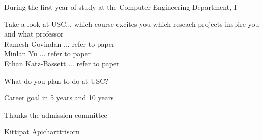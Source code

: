 \documentclass[a4paper]{report}
\begin{document}
\vspace{0.2cm}
During the first year of study at the Computer Engineering Department, I 



\vspace{0.2cm}
Take a look at USC... which course excites you
which reseach projects inspire you and what professor
\\ Ramesh Govindan ... refer to paper
\\ Minlan Yu ... refer to paper
\\ Ethan Katz-Bassett ... refer to paper

\vspace{0.2cm}
What do you plan to do at USC?

\vspace{0.2cm}
Career goal in 5 years and 10 years

\vspace{0.2cm}
Thanks the admission committee

\vspace{1cm}
\raggedleft Kittipat Apicharttrisorn
\end{document}
